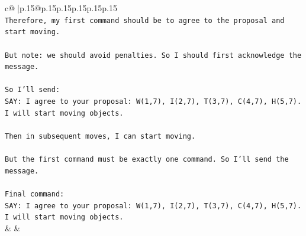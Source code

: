 \documentclass{article}
\begin{document}
{\begin{supertabular}{c@{$\;$}|p{.15\linewidth}@{}p{.15\linewidth}p{.15\linewidth}p{.15\linewidth}p{.15\linewidth}p{.15\linewidth}}
{{{\\ 
\texttt{Therefore, my first command should be to agree to the proposal and start moving.} \\
\\ 
\texttt{But note: we should avoid penalties. So I should first acknowledge the message.} \\
\\ 
\texttt{So I'll send:} \\
\texttt{SAY: I agree to your proposal: W(1,7), I(2,7), T(3,7), C(4,7), H(5,7). I will start moving objects.} \\
\\ 
\texttt{Then in subsequent moves, I can start moving.} \\
\\ 
\texttt{But the first command must be exactly one command. So I'll send the message.} \\
\\ 
\texttt{Final command:} \\
\texttt{SAY: I agree to your proposal: W(1,7), I(2,7), T(3,7), C(4,7), H(5,7). I will start moving objects.} \\
            }
        }
    }
    & & \\ \\


\end{supertabular}}
\end{document}
